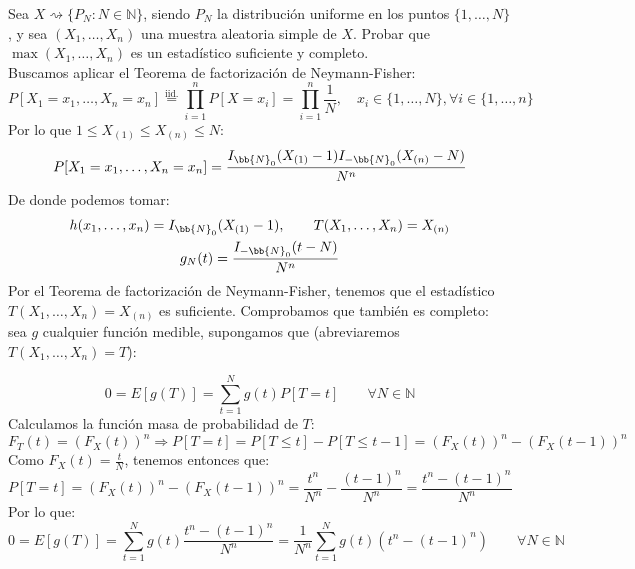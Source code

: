 \begin{ejercicio}\label{ej:3.5}
    Sea $X\rightsquigarrow\{P_N : N\in \mathbb{N}\}$, siendo $P_N$ la distribución uniforme en los puntos $\{1,\ldots,N\}$, y sea $(X_1, \ldots, X_n)$ una muestra aleatoria simple de $X$. Probar que $\max(X_1, \ldots, X_n)$ es un estadístico suficiente y completo.\\

    \noindent
    Buscamos aplicar el Teorema de factorización de Neymann-Fisher:
    \begin{equation*}
        P[X_1 = x_1, \ldots, X_n = x_n] \stackrel{\text{iid.}}{=} \prod_{i=1}^{n}P[X=x_i] =  \prod_{i=1}^{n} \dfrac{1}{N}, \quad x_i \in \{1,\ldots, N\}, \forall i \in \{1,\ldots,n\}
    \end{equation*}
    Por lo que $1\leq X_{(1)} \leq X_{(n)} \leq N$:
    \begin{equation*}
        P[X_1 = x_1, \ldots, X_n=x_n] = \dfrac{I_{\bb{N}_0}(X_{(1)}-1)I_{-\bb{N}_0}(X_{(n)}-N)}{N^n}
    \end{equation*}
    De donde podemos tomar:
    \begin{gather*}
        h(x_1, \ldots, x_n) = I_{\bb{N}_0}(X_{(1)}-1), \qquad T(X_1, \ldots, X_n) = X_{(n)} \\ 
        g_N(t) = \dfrac{I_{-\bb{N}_0}(t-N)}{N^n}
    \end{gather*}
    Por el Teorema de factorización de Neymann-Fisher, tenemos que el estadístico $T(X_1, \ldots, X_n) = X_{(n)}$ es suficiente. Comprobamos que también es completo: sea $g$ cualquier función medible, supongamos que (abreviaremos $T(X_1, \ldots, X_n) = T$):

    \begin{equation*}
        0 = E[g(T)] = \sum_{t=1}^{N}g(t)P[T=t] \qquad \forall N\in \mathbb{N}
    \end{equation*}
    Calculamos la función masa de probabilidad de $T$:
    \begin{equation*}
        F_T(t) = {(F_X(t))}^{n} \Longrightarrow P[T=t] = P[T\leq t] - P[T\leq t-1] = {(F_X(t))}^{n} - {(F_X(t-1))}^{n}
    \end{equation*}
    Como $F_X(t) = \frac{t}{N}$, tenemos entonces que:
    \begin{equation*}
        P[T=t] = {(F_X(t))}^{n} - {(F_X(t-1))}^{n} = \dfrac{t^n}{N^n} - \dfrac{{(t-1)}^{n}}{N^n} = \dfrac{t^n - {(t-1)}^{n}}{N^n}
    \end{equation*}
    Por lo que:
    \begin{equation*}
        0 = E[g(T)] = \sum_{t=1}^{N} g(t) \dfrac{t^n -{(t-1)}^{n}}{N^n} = \dfrac{1}{N^n} \sum_{t=1}^{N} g(t) (t^n - {(t-1)}^{n}) \qquad \forall N\in \mathbb{N}
    \end{equation*}


\end{ejercicio}
